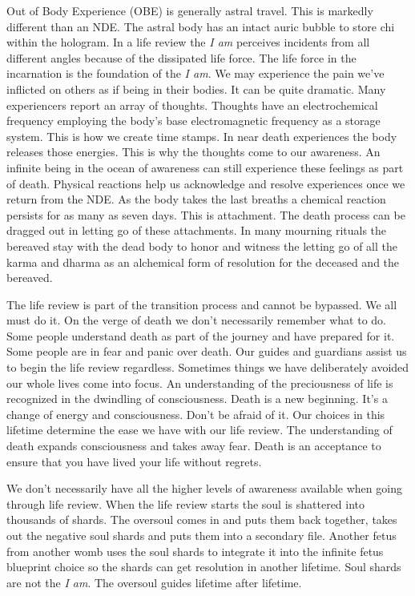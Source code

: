 Out of Body Experience (OBE) is generally astral travel. This is
markedly different than an NDE. The astral body has an intact auric
bubble to store chi within the hologram. In a life review the \emph{I
am} perceives incidents from all different angles because of the
dissipated life force. The life force in the incarnation is the
foundation of the \emph{I am}. We may experience the pain we've
inflicted on others as if being in their bodies. It can be quite
dramatic. Many experiencers report an array of thoughts. Thoughts have
an electrochemical frequency employing the body's base electromagnetic
frequency as a storage system. This is how we create time stamps. In
near death experiences the body releases those energies. This is why the
thoughts come to our awareness. An infinite being in the ocean of
awareness can still experience these feelings as part of death. Physical
reactions help us acknowledge and resolve experiences once we return
from the NDE. As the body takes the last breaths a chemical reaction
persists for as many as seven days. This is attachment. The death
process can be dragged out in letting go of these attachments. In many
mourning rituals the bereaved stay with the dead body to honor and
witness the letting go of all the karma and dharma as an alchemical form
of resolution for the deceased and the bereaved.

The life review is part of the transition process and cannot be
bypassed. We all must do it. On the verge of death we don't necessarily
remember what to do. Some people understand death as part of the journey
and have prepared for it. Some people are in fear and panic over death.
Our guides and guardians assist us to begin the life review regardless.
Sometimes things we have deliberately avoided our whole lives come into
focus. An understanding of the preciousness of life is recognized in the
dwindling of consciousness. Death is a new beginning. It's a change of
energy and consciousness. Don't be afraid of it. Our choices in this
lifetime determine the ease we have with our life review. The
understanding of death expands consciousness and takes away fear. Death
is an acceptance to ensure that you have lived your life without
regrets.

We don't necessarily have all the higher levels of awareness available
when going through life review. When the life review starts the soul is
shattered into thousands of shards. The oversoul comes in and puts them
back together, takes out the negative soul shards and puts them into a
secondary file. Another fetus from another womb uses the soul shards to
integrate it into the infinite fetus blueprint choice so the shards can
get resolution in another lifetime. Soul shards are not the \emph{I am}.
The oversoul guides lifetime after lifetime.

